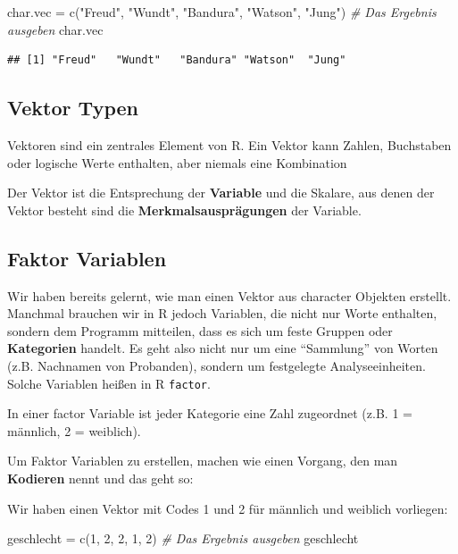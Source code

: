 \documentclass[
]{book}
\newenvironment{Shaded}{\begin{snugshade}}{\end{snugshade}}
\newcommand{\CommentTok}[1]{\textcolor[rgb]{0.56,0.35,0.01}{\textit{#1}}}
\newcommand{\DecValTok}[1]{\textcolor[rgb]{0.00,0.00,0.81}{#1}}
\newcommand{\FunctionTok}[1]{\textcolor[rgb]{0.00,0.00,0.00}{#1}}
\newcommand{\NormalTok}[1]{#1}
\newcommand{\OtherTok}[1]{\textcolor[rgb]{0.56,0.35,0.01}{#1}}
\newcommand{\StringTok}[1]{\textcolor[rgb]{0.31,0.60,0.02}{#1}}
\begin{document}
\begin{Shaded}
\begin{Highlighting}[]
\NormalTok{char.vec }\OtherTok{=} \FunctionTok{c}\NormalTok{(}\StringTok{"Freud"}\NormalTok{, }\StringTok{"Wundt"}\NormalTok{, }\StringTok{"Bandura"}\NormalTok{, }\StringTok{"Watson"}\NormalTok{, }\StringTok{"Jung"}\NormalTok{)}
\CommentTok{\# Das Ergebnis ausgeben}
\NormalTok{char.vec}
\end{Highlighting}
\end{Shaded}

\begin{verbatim}
## [1] "Freud"   "Wundt"   "Bandura" "Watson"  "Jung"
\end{verbatim}

\hypertarget{vektor-typen}{%
\subsection{Vektor Typen}\label{vektor-typen}}

Vektoren sind ein zentrales Element von R. Ein Vektor kann Zahlen, Buchstaben oder logische Werte enthalten, aber niemals eine Kombination

Der Vektor ist die Entsprechung der \textbf{Variable} und die Skalare, aus denen der Vektor besteht sind die \textbf{Merkmalsausprägungen} der Variable.

\hypertarget{faktor-variablen}{%
\subsection{Faktor Variablen}\label{faktor-variablen}}

Wir haben bereits gelernt, wie man einen Vektor aus character Objekten erstellt. Manchmal brauchen wir in R jedoch Variablen, die nicht nur Worte enthalten, sondern dem Programm mitteilen, dass es sich um feste Gruppen oder \textbf{Kategorien} handelt. Es geht also nicht nur um eine ``Sammlung'' von Worten (z.B. Nachnamen von Probanden), sondern um festgelegte Analyseeinheiten. Solche Variablen heißen in R \texttt{factor}.

In einer factor Variable ist jeder Kategorie eine Zahl zugeordnet (z.B. 1 = männlich, 2 = weiblich).

Um Faktor Variablen zu erstellen, machen wie einen Vorgang, den man \textbf{Kodieren} nennt und das geht so:

Wir haben einen Vektor mit Codes 1 und 2 für männlich und weiblich vorliegen:

\begin{Shaded}
\begin{Highlighting}[]
\NormalTok{geschlecht }\OtherTok{=} \FunctionTok{c}\NormalTok{(}\DecValTok{1}\NormalTok{, }\DecValTok{2}\NormalTok{, }\DecValTok{2}\NormalTok{, }\DecValTok{1}\NormalTok{, }\DecValTok{2}\NormalTok{)}
\CommentTok{\# Das Ergebnis ausgeben}
\NormalTok{geschlecht}
\end{Highlighting}
\end{Shaded}
\end{document}
